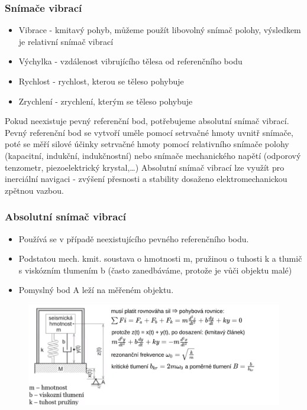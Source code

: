 \subsubsection*{Snímače vibrací}
\begin{itemize}
    \item Vibrace - kmitavý pohyb, můžeme použít libovolný snímač polohy, výsledkem je relativní snímač vibrací
    \item Výchylka - vzdálenost vibrujícího tělesa od referenčního bodu
    \item Rychlost - rychlost, kterou se těleso pohybuje
    \item Zrychlení - zrychlení, kterým se těleso pohybuje
\end{itemize}

Pokud neexistuje pevný referenční bod, potřebujeme absolutní snímač vibrací. Pevný referenční bod se vytvoří uměle pomocí setrvačné hmoty uvnitř snímače, poté se měří silové účinky setrvačné hmoty pomocí relativního snímače polohy (kapacitní, indukční, indukčnostní) nebo snímače mechanického napětí (odporový tenzometr, piezoelektrický krystal,\dots)
Absolutní snímač vibrací lze využít pro inerciální navigaci - zvýšení přesnosti a stability dosaženo elektromechanickou zpětnou vazbou.

\subsubsection*{Absolutní snímač vibrací}
\begin{itemize}
    \item Používá se v případě neexistujícího pevného referenčního bodu.
    \item Podstatou mech. kmit. soustava o hmotnosti m, pružinou o tuhosti k a tlumič s viskózním tlumením b (často zanedbáváme, protože je vůči objektu malé)
    \item Pomyslný bod A leží na měřeném objektu.
\end{itemize}

\begin{figure}[h]
    \centering
    \includegraphics[scale = 0.5]{img/AbsVib.png}
\end{figure}


